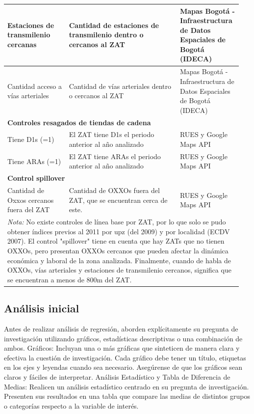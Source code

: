\documentclass{article}
\begin{document}
\begin{longtable}{p{0.25\linewidth} p{0.45\linewidth} p{0.25\linewidth}}
\midrule
Estaciones de transmilenio cercanas & Cantidad de estaciones de transmilenio dentro o cercanos al ZAT & Mapas Bogotá - Infraestructura de Datos Espaciales de Bogotá (IDECA) \\
\midrule
Cantidad acceso a vías arteriales & Cantidad de vías arteriales dentro o cercanos al ZAT & Mapas Bogotá - Infraestructura de Datos Espaciales de Bogotá (IDECA) \\
\midrule
\multicolumn{3}{l}{\textbf{Controles resagados de tiendas de cadena}} \\
\midrule
Tiene D1s (=1) & El ZAT tiene D1s el periodo anterior al año analizado & RUES y Google Maps API \\
\midrule
Tiene ARAs (=1) & El ZAT tiene ARAs el periodo anterior al año analizado & RUES y Google Maps API \\
\midrule
\multicolumn{3}{l}{\textbf{Control spillover}} \\
\midrule
Cantidad de Oxxos cercanos fuera del ZAT & Cantidad de OXXOs fuera del ZAT, que se encuentran cerca de este. & RUES y Google Maps API \\
\bottomrule
\multicolumn{3}{p{\linewidth}}{%
\vspace{0.5em}
\textit{Nota:} No existe controles de línea base por ZAT, por lo que solo se pudo obtener índices previos al 2011 por upz (del 2009) y por localidad (ECDV 2007). El control "spillover" tiene en cuenta que hay ZATs que no tienen OXXOs, pero presentan OXXOs cercanos que pueden afectar la dinámica económica y laboral de la zona analizada. Finalmente, cuando de habla de OXXOs, vías arteriales y estaciones de transmilenio cercanos, significa que se encuentran a menos de 800m del ZAT.}
\end{longtable}



\subsection{Análisis inicial}


Antes de realizar análisis de regresión, aborden explícitamente su pregunta de investigación utilizando gráficos, estadísticas descriptivas o una combinación de ambos.
Gráficos: Incluyan una o más gráficas que sinteticen de manera clara y efectiva la cuestión de investigación. Cada gráfico debe tener un título, etiquetas en los ejes y leyendas cuando sea necesario. Asegúrense de que los gráficos sean claros y fáciles de interpretar.
Análisis Estadístico y Tabla de Diferencia de Medias: Realicen un análisis estadístico centrado en su pregunta de investigación. Presenten sus resultados en una tabla que compare las medias de distintos grupos o categorías respecto a la variable de interés.
\end{document}
